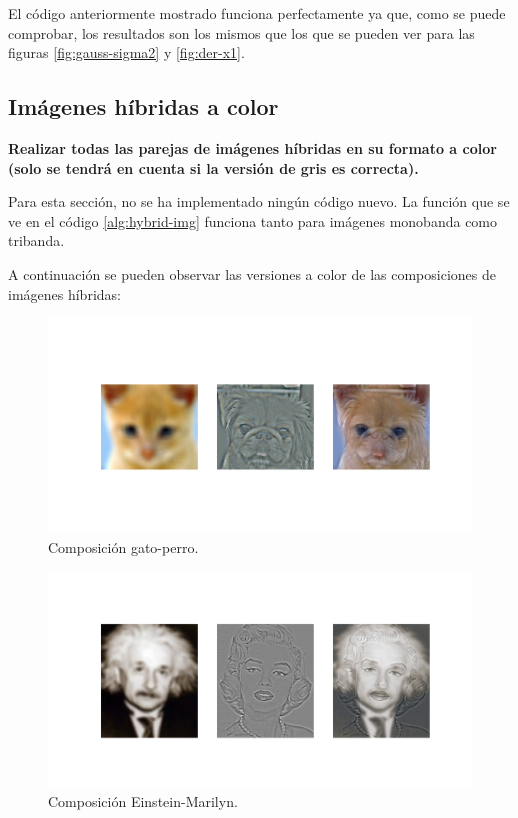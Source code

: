 \documentclass[11pt,a4paper]{article}
\begin{document}
El código anteriormente mostrado funciona perfectamente ya que, como se puede comprobar, los resultados son los mismos que los
que se pueden ver para las figuras \ref{fig:gauss-sigma2} y \ref{fig:der-x1}.

\subsection{Imágenes híbridas a color}

\noindent \textbf{Realizar todas las parejas de imágenes híbridas en su formato a color (solo se tendrá en cuenta
si la versión de gris es correcta).}

Para esta sección, no se ha implementado ningún código nuevo. La función que se ve en el código \ref{alg:hybrid-img} funciona
tanto para imágenes monobanda como tribanda.

A continuación se pueden observar las versiones a color de las composiciones de imágenes híbridas:

\begin{figure}[H]
\centering
\includegraphics[scale=0.3]{img/c-hyb1.png}
\caption{Composición gato-perro.}
\label{fig:c-hyb1}
\end{figure}

\begin{figure}[H]
\centering
\includegraphics[scale=0.3]{img/c-hyb2.png}
\caption{Composición Einstein-Marilyn.}
\label{fig:c-hyb2}
\end{figure}
\end{document}
